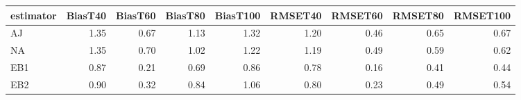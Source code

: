 \begin{table}[ht]
\centering
\begin{tabular}{lrrrrrrrr}
  \toprule
estimator & BiasT40 & BiasT60 & BiasT80 & BiasT100 & RMSET40 & RMSET60 & RMSET80 & RMSET100 \\ 
  \midrule
AJ & 1.35 & 0.67 & 1.13 & 1.32 & 1.20 & 0.46 & 0.65 & 0.67 \\ 
  NA & 1.35 & 0.70 & 1.02 & 1.22 & 1.19 & 0.49 & 0.59 & 0.62 \\ 
  EB1 & 0.87 & 0.21 & 0.69 & 0.86 & 0.78 & 0.16 & 0.41 & 0.44 \\ 
  EB2 & 0.90 & 0.32 & 0.84 & 1.06 & 0.80 & 0.23 & 0.49 & 0.54 \\ 
   \bottomrule
\end{tabular}
\end{table}
